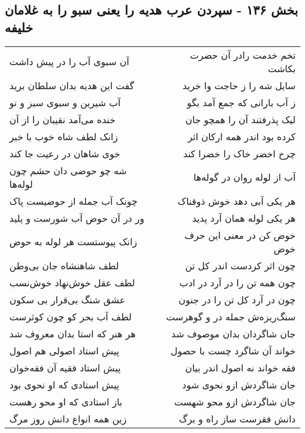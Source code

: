 \begin{center}
\section*{بخش ۱۳۶ - سپردن عرب هدیه را یعنی سبو را به  غلامان خلیفه}
\label{sec:sh136}
\begin{longtable}{l p{0.5cm} r}
آن سبوی آب را در پیش داشت
&&
تخم خدمت رادر آن حضرت بکاشت
\\
گفت این هدیه بدان سلطان برید
&&
سایل شه را ز حاجت وا خرید
\\
آب شیرین و سبوی سبز و نو
&&
ز آب بارانی که جمع آمد بگو
\\
خنده می‌آمد نقیبان را از آن
&&
لیک پذرفتند آن را همچو جان
\\
زانک لطف شاه خوب با خبر
&&
کرده بود اندر همه ارکان اثر
\\
خوی شاهان در رعیت جا کند
&&
چرخ اخضر خاک را خضرا کند
\\
شه چو حوضی دان حشم چون لوله‌ها
&&
آب از لوله روان در گوله‌ها
\\
چونک آب جمله از حوضیست پاک
&&
هر یکی آبی دهد خوش ذوقناک
\\
ور در آن حوض آب شورست و پلید
&&
هر یکی لوله همان آرد پدید
\\
زانک پیوستست هر لوله به حوض
&&
خوض کن در معنی این حرف خوض
\\
لطف شاهنشاه جان بی‌وطن
&&
چون اثر کردست اندر کل تن
\\
لطف عقل خوش‌نهاد خوش‌نسب
&&
چون همه تن را در آرد در ادب
\\
عشق شنگ بی‌قرار بی سکون
&&
چون در آرد کل تن را در جنون
\\
لطف آب بحر کو چون کوثرست
&&
سنگ‌ریزه‌ش جمله در و گوهرست
\\
هر هنر که استا بدان معروف شد
&&
جان شاگردان بدان موصوف شد
\\
پیش استاد اصولی هم اصول
&&
خواند آن شاگرد چست با حصول
\\
پیش استاد فقیه آن فقه‌خوان
&&
فقه خواند نه اصول اندر بیان
\\
پیش استادی که او نحوی بود
&&
جان شاگردش ازو نحوی شود
\\
باز استادی که او محو رهست
&&
جان شاگردش ازو محو شهست
\\
زین همه انواع دانش روز مرگ
&&
دانش فقرست ساز راه و برگ
\\
\end{longtable}
\end{center}
